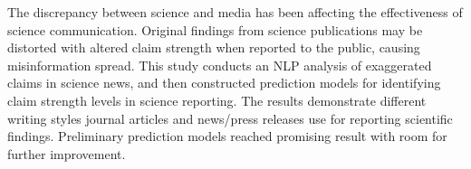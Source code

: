 The discrepancy between science and media has been affecting the effectiveness of science communication. Original findings from science publications may be distorted with altered claim strength when reported to the public, causing misinformation spread. This study conducts an NLP analysis of exaggerated claims in science news, and then constructed prediction models for identifying claim strength levels in science reporting. The results demonstrate different writing styles journal articles and news/press releases use for reporting scientific findings. Preliminary prediction models reached promising result with room for further improvement.
